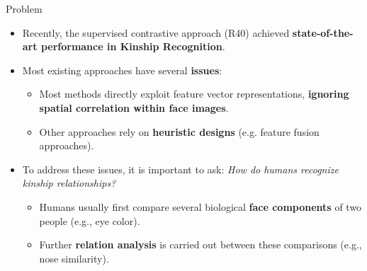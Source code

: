 \documentclass[aspectratio=169,xcolor=dvipsnames]{beamer}
\begin{document}
\begin{frame}{Problem}
    \begin{itemize}
        \item Recently, the supervised contrastive approach (R40) achieved \textbf{state-of-the-art performance in Kinship Recognition}.
        \item Most existing approaches have several \textbf{issues}:
            \begin{itemize}
                \item Most methods directly exploit feature vector representations, \textbf{ignoring spatial correlation within face images}.
                \item Other approaches rely on \textbf{heuristic designs} (e.g. feature fusion approaches).
            \end{itemize}
        \item To address these issues, it is important to ask: \textit{How do humans recognize kinship relationships?}
            \begin{itemize}
                \item Humans usually first compare several biological \textbf{face components} of two people (e.g., eye color).
                \item Further \textbf{relation analysis} is carried out between these comparisons (e.g., nose similarity).
            \end{itemize}
    \end{itemize}
\end{frame}
\end{document}
